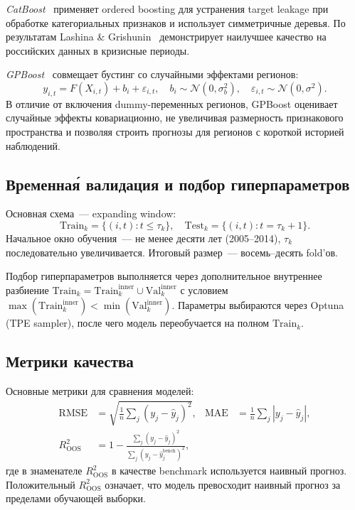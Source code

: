 \documentclass[12pt,a4paper]{article}
\begin{document}
\textit{CatBoost}~\cite{dorogush2018} применяет ordered boosting для
устранения target leakage при обработке категориальных признаков и
использует симметричные деревья. По результатам Lashina \& Grishunin~\cite{lashina2023}
демонстрирует наилучшее качество на российских данных в кризисные периоды.

\textit{GPBoost}~\cite{sigrist2022} совмещает бустинг со случайными
эффектами регионов:
\begin{equation}
  y_{i,t} = F(X_{i,t}) + b_i + \varepsilon_{i,t},
  \quad b_i \sim \mathcal{N}(0,\sigma_b^2),
  \quad \varepsilon_{i,t} \sim \mathcal{N}(0,\sigma^2).
\end{equation}
В отличие от включения dummy-переменных регионов, GPBoost оценивает
случайные эффекты ковариационно, не увеличивая размерность признакового
пространства и позволяя строить прогнозы для регионов с короткой историей
наблюдений.

\subsection{Временна\'{я} валидация и подбор гиперпараметров}

Основная схема~--- expanding window:
\begin{equation}
  \mathrm{Train}_k = \{(i,t) : t \le \tau_k\},\quad
  \mathrm{Test}_k = \{(i,t) : t = \tau_k + 1\}.
\end{equation}
Начальное окно обучения~--- не менее десяти лет (2005--2014),
$\tau_k$ последовательно увеличивается. Итоговый размер~--- восемь--десять
fold'ов.

Подбор гиперпараметров выполняется через дополнительное внутреннее
разбиение $\mathrm{Train}_k = \mathrm{Train}^{\text{inner}}_k \cup
\mathrm{Val}^{\text{inner}}_k$ с условием
$\max(\mathrm{Train}^{\text{inner}}_k) < \min(\mathrm{Val}^{\text{inner}}_k)$.
Параметры выбираются через Optuna (TPE sampler), после чего модель
переобучается на полном $\mathrm{Train}_k$.

\subsection{Метрики качества}

Основные метрики для сравнения моделей:
\begin{align}
  \mathrm{RMSE} &= \sqrt{\frac{1}{n}\sum_j(y_j - \hat{y}_j)^2}, &
  \mathrm{MAE} &= \frac{1}{n}\sum_j|y_j - \hat{y}_j|, \\[4pt]
  R^2_{\mathrm{OOS}} &= 1 - \frac{\sum_j(y_j-\hat{y}_j)^2}
  {\sum_j(y_j-\hat{y}^{\text{bench}}_j)^2},
\end{align}
где в знаменателе $R^2_{\mathrm{OOS}}$ в качестве benchmark используется
наивный прогноз. Положительный $R^2_{\mathrm{OOS}}$ означает, что модель
превосходит наивный прогноз за пределами обучающей выборки.
\end{document}
